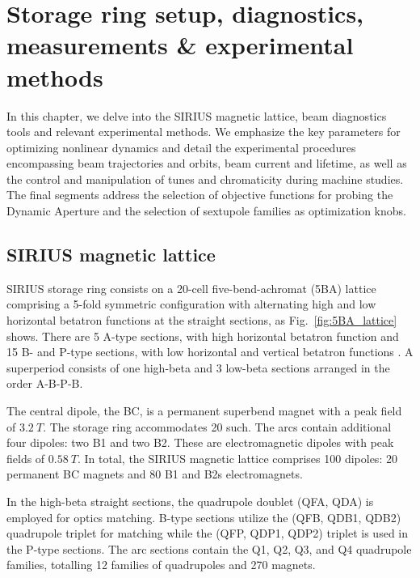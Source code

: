\chapter{Storage ring setup, diagnostics, measurements \& experimental methods}
In this chapter, we delve into the SIRIUS magnetic lattice, beam diagnostics tools and relevant experimental methods. We emphasize the key parameters  for optimizing nonlinear dynamics and detail the experimental procedures encompassing beam trajectories and orbits, beam current and lifetime, as well as the control and manipulation of tunes and chromaticity during machine studies. The final segments address the selection of objective functions for probing the Dynamic Aperture and the selection of sextupole families as optimization knobs.

\section{SIRIUS magnetic lattice}
\label{sec:mag_latt}
SIRIUS storage ring consists on a 20-cell five-bend-achromat (5BA) lattice comprising a 5-fold symmetric configuration with alternating high and low horizontal betatron functions at the straight sections, as Fig.~\ref{fig:5BA_lattice} shows. There are 5 A-type sections, with high horizontal betatron function and 15 B- and P-type sections, with low horizontal and vertical betatron functions \cite{liu_new_2016}.
A superperiod consists of one high-beta and 3 low-beta sections arranged in the order A-B-P-B.

The central dipole, the BC, is a permanent superbend magnet with a peak field of $3.2~\unit{T}$. The storage ring accommodates 20 such. The arcs contain additional four dipoles: two B1 and two B2. These are electromagnetic dipoles with peak fields of $0.58~\unit{T}$. In total, the SIRIUS magnetic lattice comprises 100 dipoles: 20 permanent BC magnets and 80 B1 and B2s electromagnets.

In the high-beta straight sections, the quadrupole doublet (QFA, QDA) is employed for optics matching. B-type sections utilize the (QFB, QDB1, QDB2) quadrupole triplet for matching while the (QFP, QDP1, QDP2) triplet is used in the P-type sections. The arc sections contain the Q1, Q2, Q3, and Q4 quadrupole families, totalling 12 families of quadrupoles and 270 magnets.

